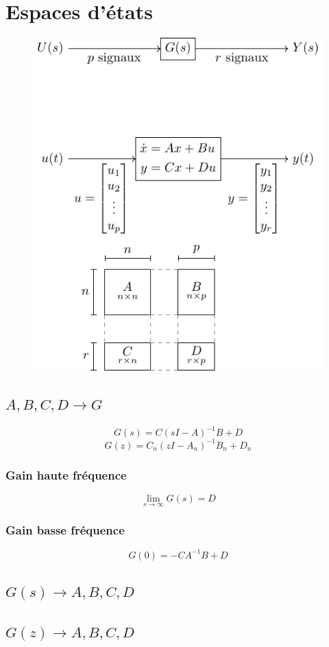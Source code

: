 \documentclass[resume]{subfiles}
\begin{document}
\section{Espaces d'états}
\begin{figure}[H]
\centering
\includegraphics[scale=1,page=1]{drwg_0.pdf}
\end{figure}
\subsection{$A,B,C,D \longrightarrow G$}
$$G(s)=C(sI-A)^{-1}B+D$$
$$G(z)=C_n(zI-A_n)^{-1}B_n+D_n$$
\subsubsection{Gain haute fréquence}
$$\lim_{s\to\infty}G(s)=D$$
\subsubsection{Gain basse fréquence}
$$G(0)=-CA^{-1}B+D$$

\subsection{$G(s)\longrightarrow A,B,C,D$}
\subsection{$G(z)\longrightarrow A,B,C,D$}
\end{document}
